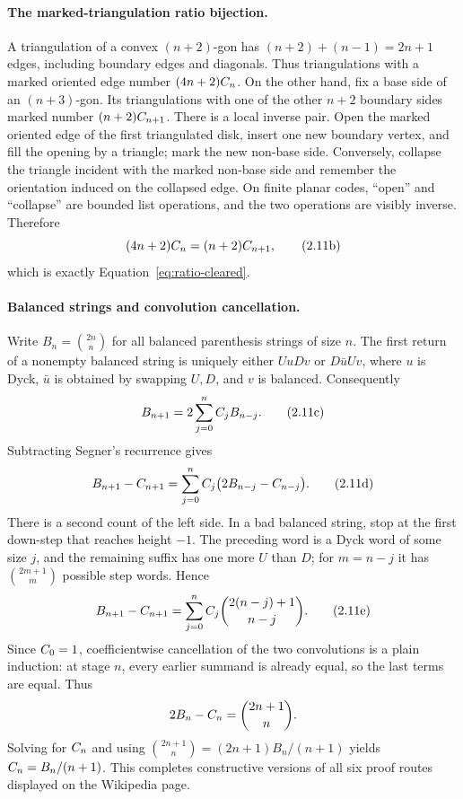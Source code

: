 \paragraph{The marked-triangulation ratio bijection.}
A triangulation of a convex $(n+2)$-gon has $(n+2)+(n-1)=2n+1$ edges, including
boundary edges and diagonals.  Thus triangulations with a marked oriented edge
number $(4n+2)C_n$.  On the other hand, fix a base side of an
$(n+3)$-gon.  Its triangulations with one of the other $n+2$ boundary sides
marked number $(n+2)C_{n+1}$.  There is a local inverse pair.  Open the
marked oriented edge of the first triangulated disk, insert one new boundary
vertex, and fill the opening by a triangle; mark the new non-base side.
Conversely, collapse the triangle incident with the marked non-base side and
remember the orientation induced on the collapsed edge.  On finite planar
codes, ``open'' and ``collapse'' are bounded list operations, and the two
operations are visibly inverse.  Therefore
\[
            (4n+2)C_n=(n+2)C_{n+1},                       \tag{2.11b}
\]
which is exactly Equation~\eqref{eq:ratio-cleared}.

\paragraph{Balanced strings and convolution cancellation.}
Write $B_n=\binom{2n}{n}$ for all balanced parenthesis strings of size $n$.
The first return of a nonempty balanced string is uniquely either
$UuDv$ or $D\bar uUv$, where $u$ is Dyck, $\bar u$ is obtained by swapping
$U,D$, and $v$ is balanced.  Consequently
\[
 B_{n+1}=2\sum_{j=0}^{n}C_j B_{n-j}.                          \tag{2.11c}
\]
Subtracting Segner's recurrence gives
\[
 B_{n+1}-C_{n+1}
   =\sum_{j=0}^{n}C_j\bigl(2B_{n-j}-C_{n-j}\bigr).         \tag{2.11d}
\]
There is a second count of the left side.  In a bad balanced string, stop at
the first down-step that reaches height $-1$.  The preceding word is a Dyck
word of some size $j$, and the remaining suffix has one more $U$ than $D$;
for $m=n-j$ it has $\binom{2m+1}{m}$ possible step words.  Hence
\[
 B_{n+1}-C_{n+1}
   =\sum_{j=0}^{n}C_j\binom{2(n-j)+1}{n-j}.                  \tag{2.11e}
\]
Since $C_0=1$, coefficientwise cancellation of the two convolutions is a
plain induction: at stage $n$, every earlier summand is already equal, so the
last terms are equal.  Thus
\[
        2B_n-C_n=\binom{2n+1}{n}.
\]
Solving for $C_n$ and using
$\binom{2n+1}{n}=(2n+1)B_n/(n+1)$ yields
$C_n=B_n/(n+1)$.  This completes constructive versions of all six proof
routes displayed on the Wikipedia page.


